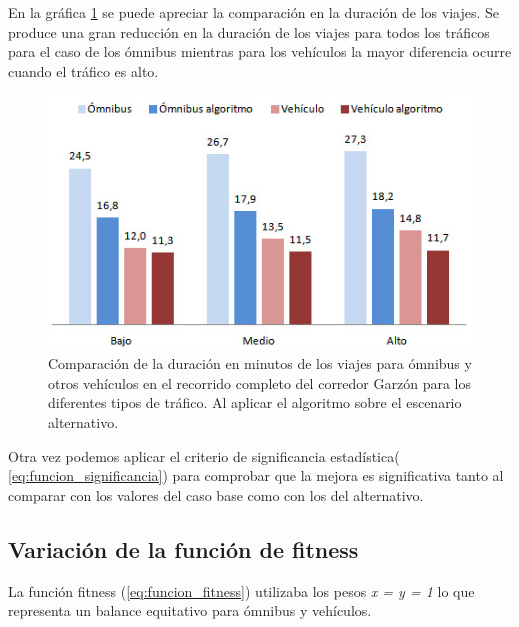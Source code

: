 En la gráfica \ref{fig:duracion_viajes_alernativo} se puede apreciar la comparación en la duración de los viajes. Se produce una gran reducción en la duración de los viajes para todos los tráficos para el caso de los ómnibus mientras para los vehículos la mayor diferencia ocurre cuando el tráfico es alto.

\begin{figure}[H]
	\centering
	\includegraphics[width=0.8\linewidth]{Figures/duracio_viajes_alternativo}
	\caption{Comparación de la duración en minutos de los viajes para ómnibus y otros vehículos en el recorrido completo del corredor Garzón para los diferentes tipos de tráfico. Al aplicar el algoritmo sobre el escenario alternativo.}
	\label{fig:duracion_viajes_alernativo}
\end{figure}

Otra vez podemos aplicar el criterio de significancia estadística( \ref{eq:funcion_significancia}) para comprobar que la mejora es significativa tanto al comparar con los valores del caso base como con los del alternativo.

\subsection{Variación de la función de fitness}

La función fitness (\ref{eq:funcion_fitness}) utilizaba los pesos \emph{x = y = 1} lo que representa un balance equitativo  para ómnibus y vehículos.


